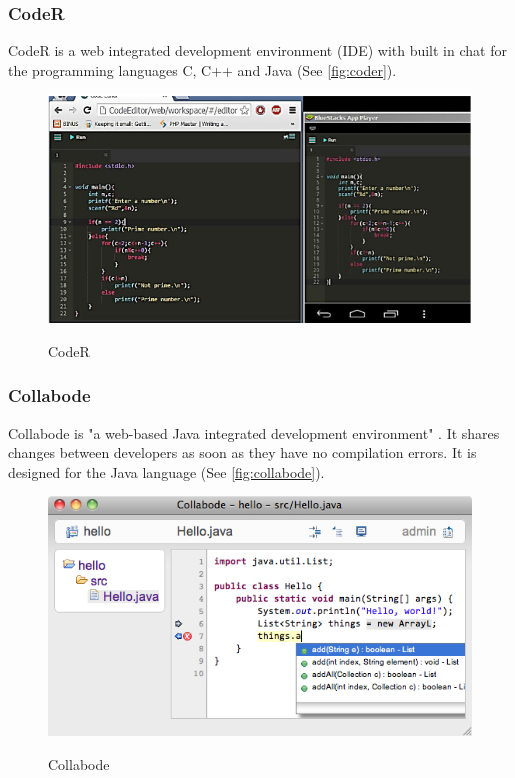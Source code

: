 \subsubsection{CodeR}
CodeR \cite{KurniawanSoesantoWijaya:2015:CodeR:Real-timeCodeEditorApplicationforCollaborativeProgramming} is a web integrated development environment (IDE) with built in chat for the programming languages C, C++ and Java (See \autoref{fig:coder}).
\begin{figure}[hb]
    \centering
    \includegraphics[width=1\linewidth]{figures/screenshots/CodeR.png}
	\caption{CodeR }
	\cite{KurniawanSoesantoWijaya:2015:CodeR:Real-timeCodeEditorApplicationforCollaborativeProgramming}
    \label{fig:coder}
\end{figure}

\subsubsection{Collabode}
Collabode is "a web-based Java integrated development environment" \cite{Goldman:2011:RCC:2047196.2047215}. It shares changes between developers as soon as they have no compilation errors. It is designed for the Java language (See \autoref{fig:collabode}).
\begin{figure}[h]
    \centering
    \includegraphics[width=1\linewidth]{figures/screenshots/collabode.jpg}
	\caption{Collabode}
	\cite{Goldman:2011:RCC:2047196.2047215}
    \label{fig:collabode}
\end{figure}

